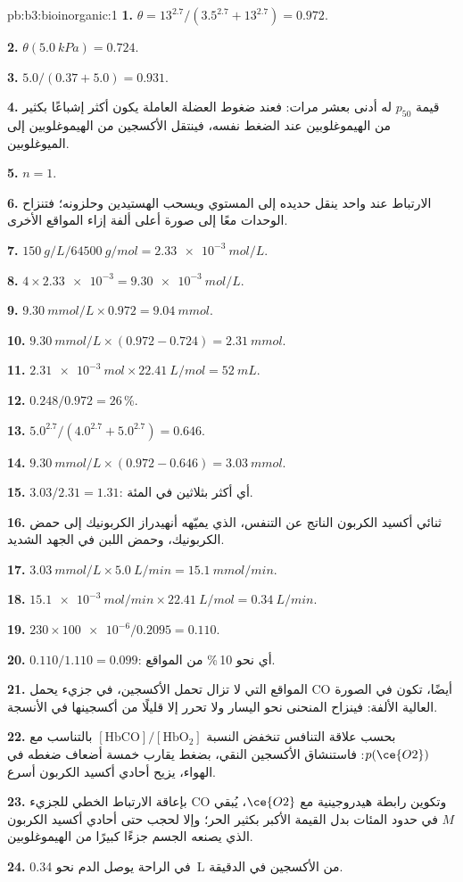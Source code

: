 \begin{solution}{pb:b3:bioinorganic:1}
\textbf{1.} $\theta = 13^{2.7}/(3.5^{2.7} + 13^{2.7}) = 0.972$.

\textbf{2.} $\theta(\qty{5.0}{kPa}) = 0.724$.

\textbf{3.} $5.0/(0.37 + 5.0) = 0.931$.

\textbf{4.} قيمة $p_{50}$ له أدنى بعشر مرات: فعند ضغوط العضلة العاملة يكون أكثر
إشباعًا بكثير من الهيموغلوبين عند الضغط نفسه، فينتقل الأكسجين من
الهيموغلوبين إلى الميوغلوبين.

\textbf{5.} $n = 1$.

\textbf{6.} الارتباط عند  واحد ينقل حديده إلى المستوي ويسحب الهستيدين 
وحلزونه؛ فتنزاح الوحدات معًا إلى صورة أعلى ألفة إزاء
المواقع الأخرى.

\textbf{7.} $\qty{150}{g/L}/\qty{64500}{g/mol} = \qty{2.33e-3}{mol/L}$.

\textbf{8.} $4 \times \num{2.33e-3} = \qty{9.30e-3}{mol/L}$.

\textbf{9.} $\qty{9.30}{mmol/L} \times 0.972 = \qty{9.04}{mmol}$.

\textbf{10.} $\qty{9.30}{mmol/L} \times (0.972 - 0.724) = \qty{2.31}{mmol}$.

\textbf{11.} $\qty{2.31e-3}{mol} \times \qty{22.41}{L/mol} = \qty{52}{mL}$.

\textbf{12.} $0.248/0.972 = 26$\,\%.

\textbf{13.} $5.0^{2.7}/(4.0^{2.7} + 5.0^{2.7}) = 0.646$.

\textbf{14.} $\qty{9.30}{mmol/L} \times (0.972 - 0.646) = \qty{3.03}{mmol}$.

\textbf{15.} $3.03/2.31 = 1.31$: أي أكثر بثلاثين في المئة.

\textbf{16.} ثنائي أكسيد الكربون الناتج عن التنفس، الذي يميّهه أنهيدراز الكربونيك إلى حمض
الكربونيك، وحمض اللبن في الجهد الشديد.

\textbf{17.} $\qty{3.03}{mmol/L} \times \qty{5.0}{L/min} = \qty{15.1}{mmol/min}$.

\textbf{18.} $\qty{15.1e-3}{mol/min} \times \qty{22.41}{L/mol} = \qty{0.34}{L/min}$.

\textbf{19.} $230 \times \num{100e-6}/0.2095 = 0.110$.

\textbf{20.} $0.110/1.110 = 0.099$: أي نحو 10\,\% من المواقع.

\textbf{21.} المواقع التي لا تزال تحمل الأكسجين، في جزيء يحمل CO أيضًا، تكون في
الصورة العالية الألفة: فينزاح المنحنى نحو اليسار ولا تحرر إلا قليلًا من
أكسجينها في الأنسجة.

\textbf{22.} بحسب علاقة التنافس تنخفض النسبة $[\mathrm{HbCO}]/[\mathrm{HbO_2}]$ بالتناسب مع $p(\ce{O2})$:
فاستنشاق الأكسجين النقي، بضغط يقارب خمسة أضعاف ضغطه في الهواء، يزيح أحادي
أكسيد الكربون أسرع.

\textbf{23.} بإعاقة الارتباط الخطي للجزيء CO وتكوين رابطة هيدروجينية مع $\ce{O2}$، يُبقي $M$ في
حدود المئات بدل القيمة الأكبر بكثير  الحر؛ وإلا لحجب حتى
أحادي أكسيد الكربون الذي يصنعه الجسم جزءًا كبيرًا من الهيموغلوبين.

\textbf{24.} في الراحة يوصل الدم نحو \qty{0.34}{L} من الأكسجين في الدقيقة.
\end{solution}
